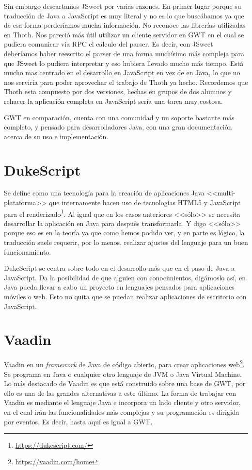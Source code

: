 Sin embargo descartamos JSweet por varias razones. En primer lugar porque su traducción de Java a JavaScript es muy literal y no es lo que buscábamos ya que de esa forma perderíamos mucha información.	No reconoce las librerías utilizadas en Thoth. Nos pareció más útil utilizar un cliente servidor en GWT en el cual se pudiera comunicar vía RPC el cálculo del parser. Es decir, con JSweet deberíamos haber reescrito el parser de una forma muchísimo más compleja para que JSweet lo pudiera interpretar y eso hubiera llevado mucho más tiempo. Está mucho mas centrado en el desarrollo en JavaScript en vez de en Java, lo que no nos serviría para poder aprovechar el trabajo de Thoth ya hecho. Recordemos que Thoth esta compuesto por dos versiones, hechas en grupos de dos alumnos y rehacer la aplicación completa en JavaScript sería una tarea muy costosa.

GWT en comparación, cuenta con una comunidad y un soporte bastante más completo, y pensado para desarrolladores Java, con una gran documentación acerca de su uso e implementación.

\section{DukeScript}

Se define como una tecnología para la creación de aplicaciones Java <<multi-plataforma>> que internamente hacen uso de tecnologías HTML5 y JavaScript para el renderizado\footnote{\url{https://dukescript.com/}}.
Al igual que en los casos anteriores <<sólo>> se necesita desarrollar la aplicación en Java para después transformarla. Y digo <<sólo>> porque eso es en la teoría ya que como hemos podido ver, y en parte es lógico, la traducción suele requerir, por lo menos, realizar ajustes del lenguaje para un buen funcionamiento.

DukeScript se centra sobre todo en el desarrollo más que en el paso de Java a JavaScript. Da la posibilidad de que alguien con conocimientos, digámoslo así, en Java pueda llevar a cabo un proyecto en lenguajes pensados para aplicaciones móviles o web. Esto no quita que se puedan realizar aplicaciones de escritorio con JavaScript.

\section{Vaadin}

Vaadin en un \emph{framework} de Java de código abierto, para crear aplicaciones web\footnote{\url{https://vaadin.com/home}}. Se programa en Java o cualquier otro lenguaje de JVM o Java Virtual Machine. Lo más destacado de Vaadin es que está construido sobre una base de GWT, por ello es una de las grandes alternativas a este último. La forma de trabajar con Vaadin es mediante el lenguaje Java e incorpora un lado cliente y otro servidor, en el cual irán las funcionalidades más complejas y su programación es dirigida por eventos. Es decir, hasta aquí es igual a GWT.


